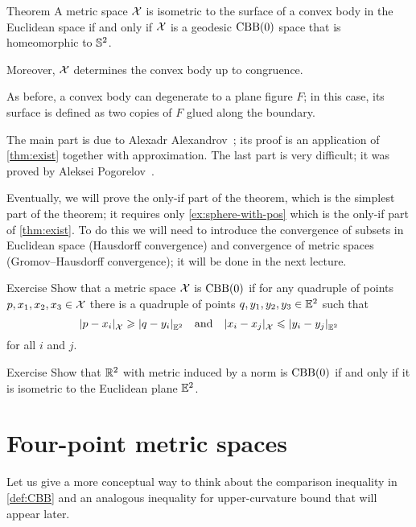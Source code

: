 \begin{thm}{Theorem}\label{thm:alexandrov+pogorelov}
A metric space $\mathcal{X}$ is isometric to the surface of a convex body in the Euclidean space if and only if $\mathcal{X}$ is a geodesic $\mathrm{CBB}(0)$ space that is homeomorphic to $\mathbb{S}^2$.

Moreover, $\mathcal{X}$ determines the convex body up to congruence.
\end{thm}

As before, a convex body can degenerate to a plane figure $F$;
in this case, its surface is defined as two copies of $F$ glued along the boundary.

The main part is due to Alexadr Alexandrov~\cite{alexandrov-1948};
its proof is an application of \ref{thm:exist} together with approximation.
The last part is very difficult; it was proved by Aleksei Pogorelov~\cite{pogorelov}.

Eventually, we will prove the only-if part of the theorem, which is the simplest part of the theorem;
it requires only \ref{ex:sphere-with-pos} which is
the only-if part of \ref{thm:exist}.
To do this we will need to introduce the convergence of subsets in Euclidean space (Hausdorff convergence) and convergence of metric spaces (Gromov--Hausdorff convergence); it will be done in the next lecture.

\begin{thm}{Exercise}\label{ex:(3+1)-expanding}
Show that a metric space $\mathcal{X}$ is $\mathrm{CBB}(0)$
if for any quadruple of points $p,x_1,x_2,x_3\in \mathcal{X}$ 
there is a quadruple of points $q,y_1,y_2,y_3\in\mathbb{E}^2$
such that 
\[\dist{p}{x_i}{\spc{X}}\ge\dist{q}{y_i}{\EE^2} 
\quad \text{and}\quad
\dist{x_i}{x_j}{\spc{X}}\le\dist{y_i}{y_j}{\EE^2}\] 
for all $i$ and $j$.
\end{thm}

\begin{thm}{Exercise}\label{ex:normCBB}
Show that $\mathbb{R}^2$ with metric induced by a norm is $\mathrm{CBB}(0)$ if and only if it is isometric to the Euclidean plane $\mathbb{E}^2$.
\end{thm}

\section{Four-point metric spaces}

Let us give a more conceptual way to think about the comparison inequality in \ref{def:CBB} and an analogous inequality for upper-curvature bound that will appear later.


